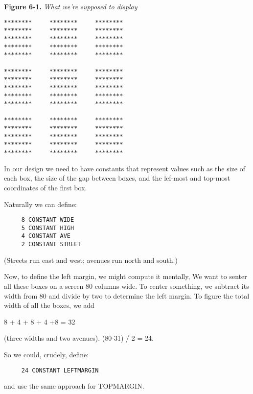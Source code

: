 \documentclass{book}
\begin{document}
\bigskip

\noindent
\begin{footnotesize}
\textbf{Figure 6-1.} \textit{What we're supposed to display}
\end{footnotesize}

\begin{verbatim}
********     ********     ********
********     ********     ********
********     ********     ********
********     ********     ********
********     ********     ********

********     ********     ********
********     ********     ********
********     ********     ********
********     ********     ********
********     ********     ********

********     ********     ********
********     ********     ********
********     ********     ********
********     ********     ********
********     ********     ********
\end{verbatim}

In our design we need to have constants that represent values such as the size of each box, the size of the gap between boxes, and the lef-most and top-most coordinates of the first box.

Naturally we can define:

\begin{verbatim}
     8 CONSTANT WIDE
     5 CONSTANT HIGH
     4 CONSTANT AVE
     2 CONSTANT STREET
\end{verbatim}

\noindent
(Streets run east and west; avenues run north and south.)

Now, to define the left margin, we might compute it mentally, We want to senter all these boxes on a screen 80 columns wide. To center something, we subtract its width from 80 and divide by two to determine the left margin. To figure the total width of all the boxes, we add

\medskip

8 + 4 + 8 + 4 +8 = 32

\medskip

\noindent
(three widths and two avenues). (80-31) / 2 = 24.

So we could, crudely, define:

\begin{verbatim}
     24 CONSTANT LEFTMARGIN
\end{verbatim}

\noindent
and use the same approach for TOPMARGIN.
\end{document}
